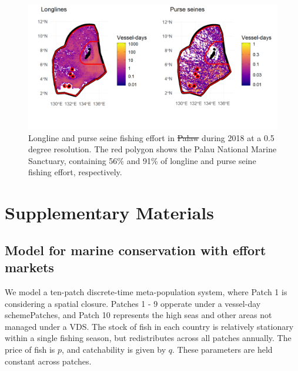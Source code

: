 \documentclass[12pt]{article}
\providecommand{\DIFaddtex}[1]{{\protect\color{blue}\uwave{#1}}} %
\providecommand{\DIFdeltex}[1]{{\protect\color{red}\sout{#1}}}                      %
\providecommand{\DIFaddFL}[1]{\DIFadd{#1}} %
\providecommand{\DIFdelFL}[1]{\DIFdel{#1}} %
\providecommand{\DIFaddbeginFL}{} %
\providecommand{\DIFaddendFL}{} %
\providecommand{\DIFdelbeginFL}{} %
\providecommand{\DIFdelendFL}{} %
\providecommand{\DIFadd}[1]{\texorpdfstring{\DIFaddtex{#1}}{#1}} %
\providecommand{\DIFdel}[1]{\texorpdfstring{\DIFdeltex{#1}}{}} %
\newcommand{\DIFscaledelfig}{0.5}
\newlength{\DIFdelgraphicswidth} %
\newlength{\DIFdelgraphicsheight} %
\newcommand{\DIFaddincludegraphics}[2][]{{\color{blue}\fbox{\DIFOincludegraphics[#1]{#2}}}} %
\newcommand{\DIFdelincludegraphics}[2][]{%
\sbox{\DIFdelgraphicsbox}{\DIFOincludegraphics[#1]{#2}}%
\settoboxwidth{\DIFdelgraphicswidth}{\DIFdelgraphicsbox} %
\settoboxtotalheight{\DIFdelgraphicsheight}{\DIFdelgraphicsbox} %
\scalebox{\DIFscaledelfig}{%
\parbox[b]{\DIFdelgraphicswidth}{\usebox{\DIFdelgraphicsbox}\\[-\baselineskip] \rule{\DIFdelgraphicswidth}{0em}}\llap{\resizebox{\DIFdelgraphicswidth}{\DIFdelgraphicsheight}{%
\setlength{\unitlength}{\DIFdelgraphicswidth}%
\begin{picture}(1,1)%
\thicklines\linethickness{2pt} %
{\color[rgb]{1,0,0}\put(0,0){\framebox(1,1){}}}%
{\color[rgb]{1,0,0}\put(0,0){\line( 1,1){1}}}%
{\color[rgb]{1,0,0}\put(0,1){\line(1,-1){1}}}%
\end{picture}%
}\hspace*{3pt}}} %
} %
\DeclareRobustCommand{\DIFaddbeginFL}{\DIFOaddbeginFL \let\includegraphics\DIFaddincludegraphics} %
\DeclareRobustCommand{\DIFaddendFL}{\DIFOaddendFL \let\includegraphics\DIFOincludegraphics} %
\DeclareRobustCommand{\DIFdelbeginFL}{\DIFOdelbeginFL \let\includegraphics\DIFdelincludegraphics} %
\DeclareRobustCommand{\DIFdelendFL}{\DIFOaddendFL \let\includegraphics\DIFOincludegraphics} %
\begin{document}
\begin{figure}
\centering
\includegraphics{img/plw_2018.png}
\caption{\label{fig:plw_2018}Longline and purse seine fishing effort in \DIFdelbeginFL \DIFdelFL{Palaw }\DIFdelendFL \DIFaddbeginFL \DIFaddFL{Palau }\DIFaddendFL during 2018 at a 0.5 degree resolution. The red polygon shows the Palau National Marine Sanctuary, containing 56\% and 91\% of longline and purse seine fishing effort, respectively.}
\end{figure}


\clearpage

\FloatBarrier

\newcommand{\beginsupplement}{\setcounter{table}{0}  \renewcommand{\thetable}{S\arabic{table}} \setcounter{figure}{0} \renewcommand{\thefigure}{S\arabic{figure}}}

\setcounter{table}{0}  \renewcommand{\thetable}{S\arabic{table}} \setcounter{figure}{0} \renewcommand{\thefigure}{S\arabic{figure}}

\section{Supplementary Materials}

\subsection{Model for marine conservation with effort markets}

We model a ten-patch discrete-time meta-population system, where Patch 1 is considering a spatial closure. Patches 1 - 9 opperate under a vessel-day schemePatches, and Patch 10 represents the high seas and other areas not managed under a VDS. The stock of fish in each country is relatively stationary within a single fishing season, but redistributes across all patches annually. The price of fish is $p$, and catchability is given by $q$. These parameters are held constant across patches.
\end{document}
